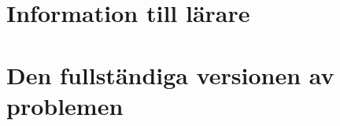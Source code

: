 \documentclass[11pt,a4paper]{article}
\begin{document}
\newpage
\begin{thebibliography}{3}
    
\end{thebibliography}

\newpage
{}
\appendix

\section{Information till lärare}

\section{Den fullständiga versionen av problemen}
\end{document}
